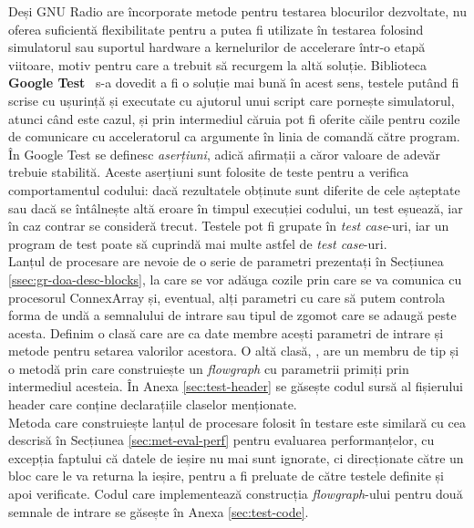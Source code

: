 Deși GNU Radio are încorporate metode pentru testarea blocurilor dezvoltate, nu
oferea suficientă flexibilitate pentru a putea fi utilizate în testarea folosind
simulatorul sau suportul hardware a kernelurilor de accelerare într-o
etapă viitoare, motiv pentru care a trebuit să recurgem la altă soluție.
Biblioteca \textbf{Google Test}~\cite{gtest} s-a dovedit a fi o soluție mai bună
în acest sens, testele putând fi scrise cu ușurință și executate cu ajutorul
unui script care pornește simulatorul, atunci când este cazul, și prin
intermediul căruia pot fi oferite căile pentru cozile de comunicare cu
acceleratorul ca argumente în linia de comandă către program. \\

În Google Test se definesc \textit{aserțiuni}, adică afirmații a căror valoare
de adevăr trebuie stabilită. Aceste aserțiuni sunt folosite de teste pentru a
verifica comportamentul codului: dacă rezultatele obținute sunt diferite de cele
așteptate sau dacă se întâlnește altă eroare în timpul execuției codului, un
test eșuează, iar în caz contrar se consideră trecut. Testele pot fi grupate în
\textit{test case}-uri, iar un program de test poate să cuprindă mai multe
astfel de \textit{test case}-uri. \\

Lanțul de procesare are nevoie de o serie de parametri prezentați în Secțiunea 
\ref{ssec:gr-doa-desc-blocks}, la care se vor adăuga cozile prin care se va
comunica cu procesorul ConnexArray și, eventual, alți parametri cu care să putem
controla forma de undă a semnalului de intrare sau tipul de zgomot care se
adaugă peste acesta. Definim o clasă  care are ca
date membre acești parametri de intrare și metode pentru setarea valorilor
acestora. O altă clasă, , are un membru de tip
 și o metodă prin care construiește un
\textit{flowgraph} cu parametrii primiți prin intermediul acesteia. În Anexa
\ref{sec:test-header} se găsește codul sursă al fișierului header care conține
declarațiile claselor menționate. \\

Metoda care construiește lanțul de procesare folosit în testare este similară cu
cea descrisă în Secțiunea \ref{sec:met-eval-perf} pentru evaluarea
performanțelor, cu excepția faptului că datele de ieșire nu mai sunt ignorate,
ci direcționate către un bloc care le va returna la ieșire, pentru a fi preluate
de către testele definite și apoi verificate. Codul care implementează
construcția \textit{flowgraph}-ului pentru două semnale de intrare se găsește în
Anexa \ref{sec:test-code}. \\

